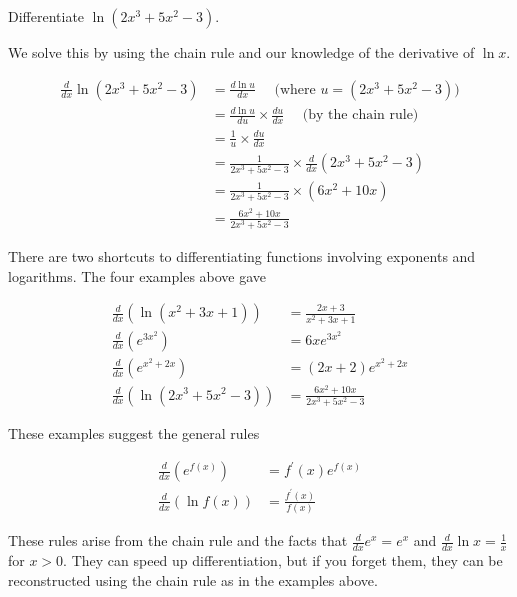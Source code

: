 \begin{example}

Differentiate \(\ln \left(2 x^3+5 x^2-3\right)\).
\end{example}
\begin{solution}
We solve this by using the chain rule and our knowledge of the derivative of \(\ln x\).

\[
\begin{aligned}
\frac{d}{d x} \ln \left(2 x^3+5 x^2-3\right) & =\frac{d \ln u}{d x} \quad \text { (where } u=\left(2 x^3+5 x^2-3\right)\text{)} \\
& =\frac{d \ln u}{d u} \times \frac{d u}{d x} \quad \text { (by the chain rule) } \\
& =\frac{1}{u} \times \frac{d u}{d x} \\
& =\frac{1}{2 x^3+5 x^2-3} \times \frac{d}{d x}\left(2 x^3+5 x^2-3\right) \\
& =\frac{1}{2 x^3+5 x^2-3} \times\left(6 x^2+10 x\right) \\
& =\frac{6 x^2+10 x}{2 x^3+5 x^2-3}
\end{aligned}
\]
\end{solution}

There are two shortcuts to differentiating functions involving exponents and logarithms. The four examples above gave

\[
\begin{aligned}
\frac{d}{d x}\left(\ln\left(x^2+3 x+1\right)\right) & =\frac{2 x+3}{x^2+3 x+1} \\
\frac{d}{d x}\left(e^{3 x^2}\right) & =6 x e^{3 x^2} \\
\frac{d}{d x}\left(e^{x^2+2 x}\right) & =\left(2x+2\right)e^{x^2+2 x} \\
\frac{d}{d x}\left(\ln\left(2 x^3+5 x^2-3\right)\right) & =\frac{6 x^2+10 x}{2 x^3+5 x^2-3}
\end{aligned}
\]


These examples suggest the general rules

\[
\begin{aligned}
\frac{d}{d x}\left(e^{f(x)}\right) & =f^{\prime}(x) e^{f(x)} \\
\frac{d}{d x}(\ln f(x)) & =\frac{f^{\prime}(x)}{f(x)}
\end{aligned}
\]


These rules arise from the chain rule and the facts that \(\frac{d}{dx}e^x=e^x\) and \(\frac{d}{dx}\ln x=\frac{1}{x}\) for $x>0$. They can speed up differentiation, but if you forget them, they can be reconstructed using the chain rule as in the examples above.


